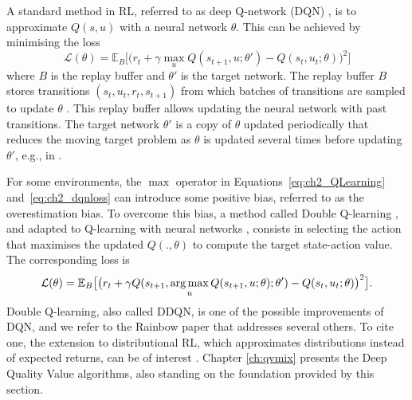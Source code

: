 A standard method in RL, referred to as deep Q-network (DQN) \citep{Mnih2015}, is to approximate $Q(s, u)$ with a neural network $\theta$.
This can be achieved by minimising the loss 
\begin{equation}
\label{eq:ch2_dqnloss}
    \mathcal{L}(\theta) = \mathbb{E}_B \big[\big(r_{t} + \gamma \max_u Q(s_{t+1}, u; \theta')- Q(s_{t}, u_{t}; \theta)\big)^{2}\big]
\end{equation}
where $B$ is the replay buffer and $\theta'$ is the target network.
The replay buffer $B$ stores transitions $(s_{t},u_{t},r_{t},s_{t+1})$ from which batches of transitions are sampled to update $\theta$ \citep{lin1992self}.
This replay buffer allows updating the neural network with past transitions.
The target network $\theta'$ is a copy of $\theta$ updated periodically that reduces the moving target problem as $\theta$ is updated several times before updating $\theta'$, e.g., in \citep{Mnih2015}.

For some environments, the $\max$ operator in Equations~\ref{eq:ch2_QLearning} and~\ref{eq:ch2_dqnloss} can introduce some positive bias, referred to as the overestimation bias.
To overcome this bias, a method called Double Q-learning \citep{hasselt2010double}, and adapted to Q-learning with neural networks \citep{van2016deep}, consists in selecting the action that maximises the updated $Q(., \theta)$ to compute the target state-action value.
The corresponding loss is 
\begin{equation}
    \label{eq:ch2_doubleQ}
    \mathcal{L}(\theta) = \mathbb{E}_{B} \big[\big(r_{t} + \gamma Q(s_{t+1}, \operatorname*{arg\,max}_u Q(s_{t+1}, u;\theta) ; \theta')- Q(s_{t}, u_{t}; \theta)\big)^{2}\big].
\end{equation}
Double Q-learning, also called DDQN, is one of the possible improvements of DQN, and we refer to the Rainbow paper \citep{hessel2018rainbow} that addresses several others.
To cite one, the extension to distributional RL, which approximates distributions instead of expected returns, can be of interest \citep{bellemare2017distributional, THEATE2023199}.
Chapter \ref{ch:qvmix} presents the Deep Quality Value algorithms, also standing on the foundation provided by this section.

